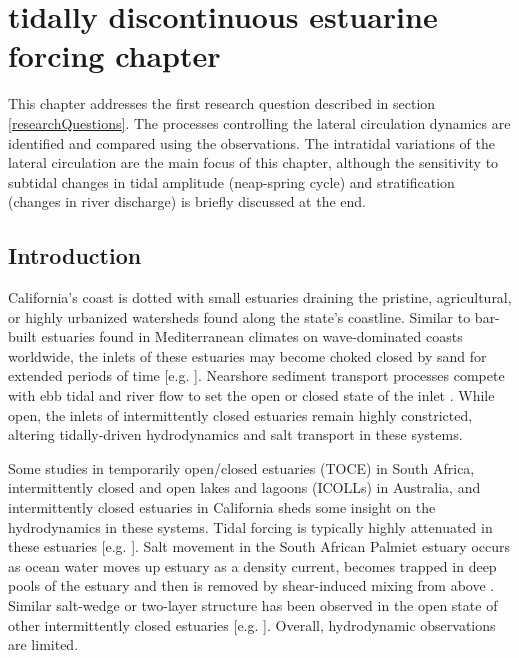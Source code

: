 \chapter{tidally discontinuous estuarine forcing chapter}
\label{chCirculation}

This chapter addresses the first research question described in section \ref{researchQuestions}. The processes controlling the lateral circulation dynamics are identified and compared using the observations. The intratidal variations of the lateral circulation are the main focus of this chapter, although the sensitivity to subtidal changes in tidal amplitude (neap-spring cycle) and stratification (changes in river discharge) is briefly discussed at the end. 




\section{Introduction}

California's coast is dotted with small estuaries draining the pristine,
agricultural, or highly urbanized watersheds found along the state's
coastline. Similar to bar-built estuaries found in Mediterranean climates
on wave-dominated coasts worldwide, the inlets of these estuaries
may become choked closed by sand for extended periods of time {[}e.g.
\citealp{elwany_etal_1998,hanes_etal_2011,fortunato_etal_2014,ranasinghe_pattiaratchi_2003}{]}.
Nearshore sediment transport processes compete with ebb tidal and
river flow to set the open or closed state of the inlet \citep{behrens_etal_2013}.
While open, the inlets of intermittently closed estuaries remain highly
constricted, altering tidally-driven hydrodynamics and salt transport
in these systems.

Some studies in temporarily open/closed estuaries (TOCE) in South
Africa, intermittently closed and open lakes and lagoons (ICOLLs)
in Australia, and intermittently closed estuaries in California sheds
some insight on the hydrodynamics in these systems. Tidal forcing
is typically highly attenuated in these estuaries {[}e.g. \citealp{ranasinghe_pattiaratchi_1999,gale_etal_2007}{]}.
Salt movement in the South African Palmiet estuary occurs as ocean
water moves up estuary as a density current, becomes trapped in deep
pools of the estuary and then is removed by shear-induced mixing from
above \citep{largier_and_taljaard_1991}. Similar salt-wedge or two-layer
structure has been observed in the open state of other intermittently
closed estuaries {[}e.g. \citealp{sharples_etal_2003}{]}. Overall,
hydrodynamic observations are limited.

